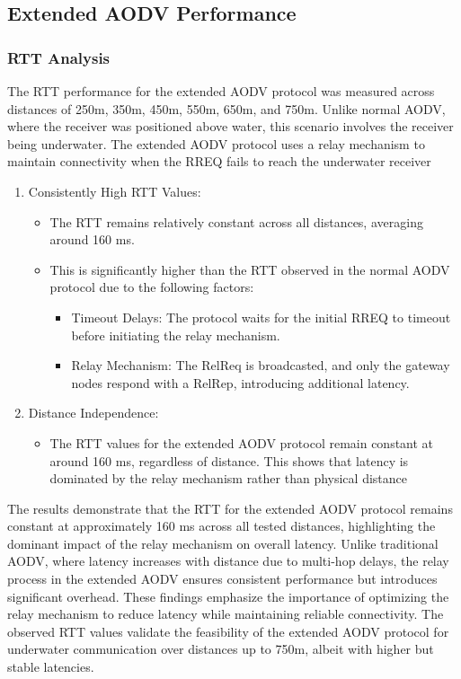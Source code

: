 \documentclass[]{nsm-thesis}
\begin{document}
\subsection{Extended AODV Performance}
\subsubsection{RTT Analysis}
The RTT performance for the extended AODV protocol was measured across distances of 250m, 350m, 450m, 550m, 650m, and 750m. Unlike normal AODV, where the receiver was positioned above water, this scenario involves the receiver being underwater. The extended AODV protocol uses a relay mechanism to maintain connectivity when the RREQ fails to reach the underwater receiver
\begin{enumerate}
    \item Consistently High RTT Values:
    \begin{itemize}
        \item The RTT remains relatively constant across all distances, averaging around 160 ms.
        \item This is significantly higher than the RTT observed in the normal AODV protocol due to the following factors:
        \begin{itemize}
            \item Timeout Delays: The protocol waits for the initial RREQ to timeout before initiating the relay mechanism.
            \item Relay Mechanism: The RelReq is broadcasted, and only the gateway nodes respond with a RelRep, introducing additional latency.

        \end{itemize}
        
    \end{itemize}
    \item Distance Independence:
    \begin{itemize}
        \item The RTT values for the extended AODV protocol remain constant at around 160 ms, regardless of distance. This shows that latency is dominated by the relay mechanism rather than physical distance
    \end{itemize}
\end{enumerate}
The results demonstrate that the RTT for the extended AODV protocol remains constant at approximately 160 ms across all tested distances, highlighting the dominant impact of the relay mechanism on overall latency. Unlike traditional AODV, where latency increases with distance due to multi-hop delays, the relay process in the extended AODV ensures consistent performance but introduces significant overhead. These findings emphasize the importance of optimizing the relay mechanism to reduce latency while maintaining reliable connectivity. The observed RTT values validate the feasibility of the extended AODV protocol for underwater communication over distances up to 750m, albeit with higher but stable latencies.
\end{document}

